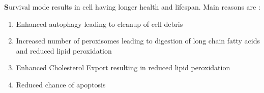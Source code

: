 \textbf Survival mode results in cell having longer health and lifespan. Main reasons are :
\begin{enumerate}
\item Enhanced autophagy leading to cleanup of cell debris
\item Increased number of peroxisomes leading to digestion of long chain fatty acids and reduced lipid peroxidation
\item Enhanced Cholesterol Export resulting in reduced lipid peroxidation
\item Reduced chance of apoptosis
\end{enumerate}
